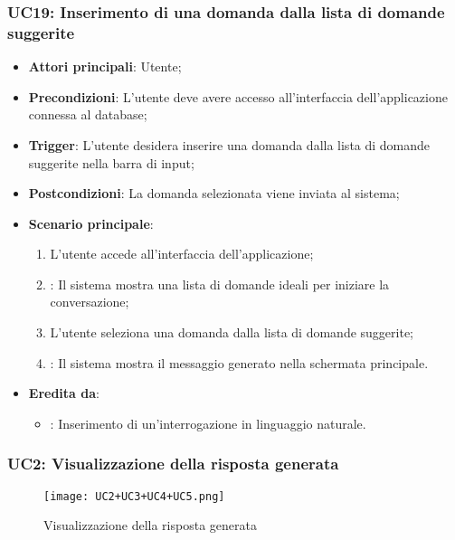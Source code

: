 \subsubsection{UC19: Inserimento di una domanda dalla lista di domande suggerite}
\begin{itemize}
    \item \textbf{Attori principali}: Utente;
    \item \textbf{Precondizioni}: L'utente deve avere accesso all'interfaccia dell'applicazione connessa al database;
    \item \textbf{Trigger}: L'utente desidera inserire una domanda dalla lista di domande suggerite nella barra di input;
    \item \textbf{Postcondizioni}: La domanda selezionata viene inviata al sistema;
    \item \textbf{Scenario principale}:
    \begin{enumerate}
        \item L'utente accede all'interfaccia dell'applicazione;
        \item {}: Il sistema mostra una lista di domande ideali per iniziare la conversazione;
        \item L'utente seleziona una domanda dalla lista di domande suggerite;
        \item {}: Il sistema mostra il messaggio generato nella schermata principale.
    \end{enumerate}
    \item \textbf{Eredita da}:
    \begin{itemize}
        \item {}: Inserimento di un'interrogazione in linguaggio naturale.
    \end{itemize}
\end{itemize}

\newpage

\hypertarget{UC2}{}
\subsubsection{UC2: Visualizzazione della risposta generata}

\begin{figure}[h]
    \centering
    \texttt{[image: UC2+UC3+UC4+UC5.png]}
    \caption{Visualizzazione della risposta generata}
\end{figure}

